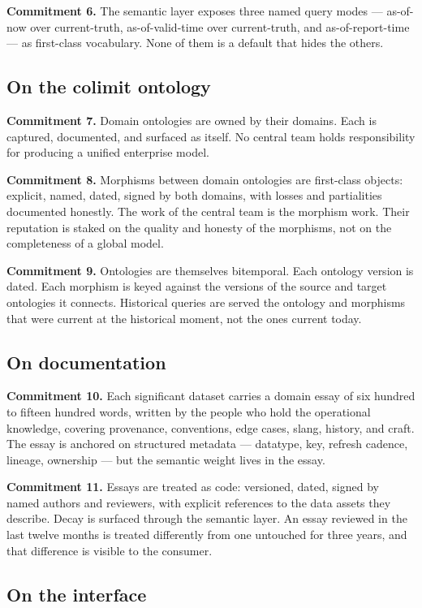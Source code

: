 \documentclass[11pt,a4paper]{article}
\begin{document}
\textbf{Commitment 6.} The semantic layer exposes three named query modes --- as-of-now over current-truth, as-of-valid-time over current-truth, and as-of-report-time --- as first-class vocabulary. None of them is a default that hides the others.

\subsection{On the colimit ontology}

\textbf{Commitment 7.} Domain ontologies are owned by their domains. Each is captured, documented, and surfaced as itself. No central team holds responsibility for producing a unified enterprise model.

\textbf{Commitment 8.} Morphisms between domain ontologies are first-class objects: explicit, named, dated, signed by both domains, with losses and partialities documented honestly. The work of the central team is the morphism work. Their reputation is staked on the quality and honesty of the morphisms, not on the completeness of a global model.

\textbf{Commitment 9.} Ontologies are themselves bitemporal. Each ontology version is dated. Each morphism is keyed against the versions of the source and target ontologies it connects. Historical queries are served the ontology and morphisms that were current at the historical moment, not the ones current today.

\subsection{On documentation}

\textbf{Commitment 10.} Each significant dataset carries a domain essay of six hundred to fifteen hundred words, written by the people who hold the operational knowledge, covering provenance, conventions, edge cases, slang, history, and craft. The essay is anchored on structured metadata --- datatype, key, refresh cadence, lineage, ownership --- but the semantic weight lives in the essay.

\textbf{Commitment 11.} Essays are treated as code: versioned, dated, signed by named authors and reviewers, with explicit references to the data assets they describe. Decay is surfaced through the semantic layer. An essay reviewed in the last twelve months is treated differently from one untouched for three years, and that difference is visible to the consumer.

\subsection{On the interface}
\end{document}
